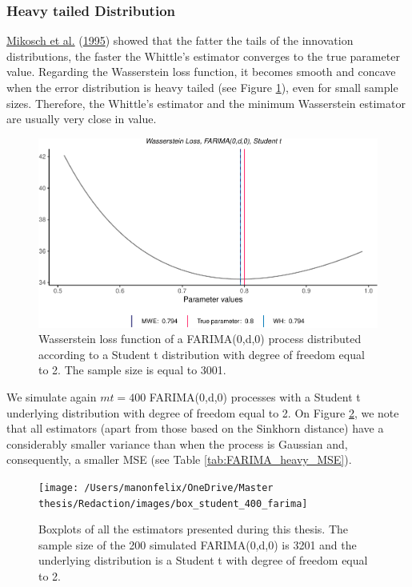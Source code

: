 \documentclass[
  11pt,
]{article}
\begin{document}
\hypertarget{heavy-tailed-distribution}{%
\subsubsection{Heavy tailed
Distribution}\label{heavy-tailed-distribution}}

\protect\hyperlink{ref-mikosch1995parameter}{Mikosch et al.}
(\protect\hyperlink{ref-mikosch1995parameter}{1995}) showed that the
fatter the tails of the innovation distributions, the faster the
Whittle's estimator converges to the true parameter value. Regarding the
Wasserstein loss function, it becomes smooth and concave when the error
distribution is heavy tailed (see Figure \ref{fig:student_t}), even for
small sample sizes. Therefore, the Whittle's estimator and the minimum
Wasserstein estimator are usually very close in value.

\begin{figure}

{\centering \includegraphics[width=0.5\linewidth]{Master_thesis_V3_files/figure-latex/student_t-1} 

}

\caption{Wasserstein loss function of a FARIMA(0,d,0) process distributed according to a Student t distribution with degree of freedom equal to 2. The sample size is equal to 3001.}\label{fig:student_t}
\end{figure}

We simulate again \(mt = 400\) FARIMA(0,d,0) processes with a Student t
underlying distribution with degree of freedom equal to 2. On Figure
\ref{fig:box_farima_student}, we note that all estimators (apart from
those based on the Sinkhorn distance) have a considerably smaller
variance than when the process is Gaussian and, consequently, a smaller
MSE (see Table \ref{tab:FARIMA_heavy_MSE}).

\begin{figure}

{\centering \texttt{[image: /Users/manonfelix/OneDrive/Master thesis/Redaction/images/box\_student\_400\_farima]} 

}

\caption{Boxplots of all the estimators presented during this thesis. The sample size of the 200 simulated FARIMA(0,d,0) is 3201 and the underlying distribution is a Student t with degree of freedom equal to 2.}\label{fig:box_farima_student}
\end{figure}
\end{document}
